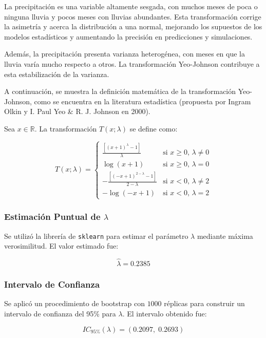 \documentclass[12pt,letterpaper]{article}   %
\begin{document}
La precipitación es una variable altamente sesgada, con muchos meses de poca o ninguna lluvia y pocos meses con lluvias abundantes. Esta transformación corrige la asimetría y acerca la distribución a una normal, mejorando los supuestos de los modelos estadísticos y aumentando la precisión en predicciones y simulaciones.

Además, la precipitación presenta varianza heterogénea, con meses en que la lluvia varía mucho respecto a otros. La transformación Yeo-Johnson contribuye a esta estabilización de la varianza.

A continuación, se muestra la definición matemática de la transformación Yeo-Johnson, como se encuentra en la literatura estadística (propuesta por Ingram Olkin y I. Paul Yeo \& R. J. Johnson en 2000).

Sea $x \in \mathbb{R}$. La transformación $T(x; \lambda)$ se define como:

$$
T(x; \lambda) =
\begin{cases}
\frac{[(x + 1)^\lambda - 1]}{\lambda} & \text{si } x \geq 0, \, \lambda \ne 0 \\
\log(x + 1) & \text{si } x \geq 0, \, \lambda = 0 \\
-\frac{[(-x + 1)^{2 - \lambda} - 1]}{2 - \lambda} & \text{si } x < 0, \, \lambda \ne 2 \\
-\log(-x + 1) & \text{si } x < 0, \, \lambda = 2
\end{cases}
$$




\subsubsection{Estimación Puntual de \texorpdfstring{$\lambda$}{λ}}

Se utilizó la librería de \texttt{sklearn} para estimar el parámetro $\lambda$ mediante máxima verosimilitud. El valor estimado fue:

\[
\hat{\lambda} = 0.2385
\]



  \subsubsection{Intervalo de Confianza}


  
Se aplicó un procedimiento de bootstrap con $1000$ réplicas para construir un intervalo de confianza del 95\% para $\lambda$. El intervalo obtenido fue:

\[
IC_{95\%}(\lambda) = (0.2097,\; 0.2693)
\]
\end{document}
